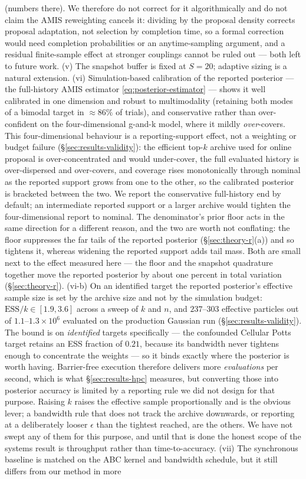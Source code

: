 (numbers there). We therefore do not correct for it algorithmically and do not claim the AMIS reweighting cancels it: dividing by the proposal density corrects proposal adaptation, not selection by completion time, so a formal correction would need completion probabilities or an anytime-sampling argument, and a residual finite-sample effect at stronger couplings cannot be ruled out --- both left to future work. (v) The snapshot buffer is fixed at $S=20$; adaptive sizing is a natural extension. (vi) Simulation-based calibration of the reported posterior --- the full-history AMIS estimator \eqref{eq:posterior-estimator} --- shows it well calibrated in one dimension and robust to multimodality (retaining both modes of a bimodal target in ${\approx}86\%$ of trials), and conservative rather than over-confident on the four-dimensional g-and-k model, where it mildly \emph{over}-covers. This four-dimensional behaviour is a reporting-support effect, not a weighting or budget failure (\S\ref{sec:results-validity}): the efficient top-$k$ archive used for online proposal is over-concentrated and would under-cover, the full evaluated history is over-dispersed and over-covers, and coverage rises monotonically through nominal as the reported support grows from one to the other, so the calibrated posterior is bracketed between the two. We report the conservative full-history end by default; an intermediate reported support or a larger archive would tighten the four-dimensional report to nominal. The denominator's prior floor acts in the same direction for a different reason, and the two are worth not conflating: the floor suppresses the far tails of the reported posterior (\S\ref{sec:theory-r}(a)) and so tightens it, whereas widening the reported support adds tail mass. Both are small next to the effect measured here --- the floor and the snapshot quadrature together move the reported posterior by about one percent in total variation (\S\ref{sec:theory-r}). (vi-b) On an identified target the reported posterior's effective sample size is set by the archive size and not by the simulation budget: $\mathrm{ESS}/k \in [1.9, 3.6]$ across a sweep of $k$ and $n$, and $237$--$303$ effective particles out of $1.1$--$1.3\times10^6$ evaluated on the production Gaussian run (\S\ref{sec:results-validity}). The bound is on \emph{identified} targets specifically --- the confounded Cellular Potts target retains an ESS fraction of $0.21$, because its bandwidth never tightens enough to concentrate the weights --- so it binds exactly where the posterior is worth having. Barrier-free execution therefore delivers more \emph{evaluations} per second, which is what \S\ref{sec:results-hpc} measures, but converting those into posterior accuracy is limited by a reporting rule we did not design for that purpose. Raising $k$ raises the effective sample proportionally and is the obvious lever; a bandwidth rule that does not track the archive downwards, or reporting at a deliberately looser $\epsilon$ than the tightest reached, are the others. We have not swept any of them for this purpose, and until that is done the honest scope of the systems result is throughput rather than time-to-accuracy. (vii) The synchronous baseline is matched on the ABC kernel and bandwidth schedule, but it still differs from our method in more 